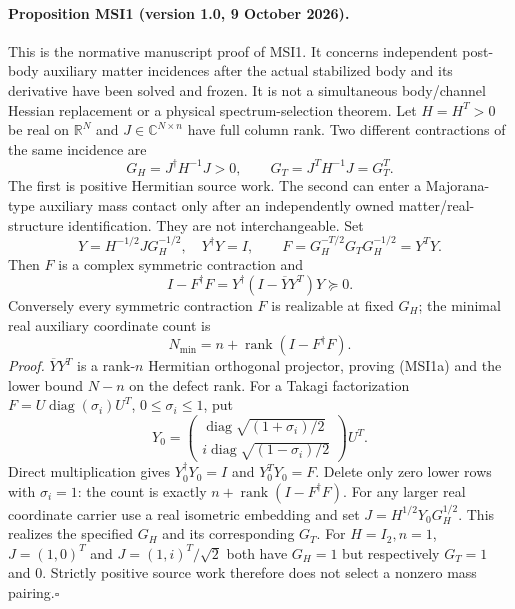 \documentclass[11pt]{article}
\begin{document}
\paragraph{Proposition MSI1 (version 1.0, 9 October 2026).}
\label{prop:msi1}
This is the normative manuscript proof of MSI1. It concerns independent
post-body auxiliary matter incidences after the actual stabilized body and
its derivative have been solved and frozen. It is not a simultaneous
body/channel Hessian replacement or a physical spectrum-selection theorem.
Let $H=H^T>0$ be real on $\mathbb R^N$ and $J\in\mathbb C^{N\times n}$
have full column rank. Two different contractions of the same incidence are
\[
 G_H=J^\dagger H^{-1}J>0,\qquad G_T=J^TH^{-1}J=G_T^T.
\]
The first is positive Hermitian source work. The second can enter a
Majorana-type auxiliary mass contact only after an independently owned
matter/real-structure identification. They are not interchangeable.
Set
\[
 Y=H^{-1/2}JG_H^{-1/2},\quad Y^\dagger Y=I,\qquad
 F=G_H^{-T/2}G_TG_H^{-1/2}=Y^TY.
\]
Then $F$ is a complex symmetric contraction and
\[
 I-F^\dagger F=Y^\dagger(I-\overline Y Y^T)Y\succeq0.
                                                               \tag{MSI1a}
\]
Conversely every symmetric contraction $F$ is realizable at fixed $G_H$;
the minimal real auxiliary coordinate count is
\[
 N_{\min}=n+\operatorname{rank}(I-F^\dagger F).                \tag{MSI1b}
\]
\emph{Proof.} $\overline Y Y^T$ is a rank-$n$ Hermitian orthogonal
projector, proving (MSI1a) and the lower bound $N-n$ on the defect rank.
For a Takagi factorization $F=U\operatorname{diag}(\sigma_i)U^T$,
$0\leq\sigma_i\leq1$, put
\[
 Y_0=\begin{pmatrix}
 \operatorname{diag}\sqrt{(1+\sigma_i)/2}\\
 i\operatorname{diag}\sqrt{(1-\sigma_i)/2}
 \end{pmatrix}U^T.
\]
Direct multiplication gives $Y_0^\dagger Y_0=I$ and $Y_0^TY_0=F$.
Delete only zero lower rows with $\sigma_i=1$: the count is exactly
$n+\operatorname{rank}(I-F^\dagger F)$. For any larger real coordinate
carrier use a real isometric embedding and set $J=H^{1/2}Y_0G_H^{1/2}$.
This realizes the specified $G_H$ and its corresponding $G_T$.
For $H=I_2,n=1$, $J=(1,0)^T$ and $J=(1,i)^T/\sqrt2$ both have
$G_H=1$ but respectively $G_T=1$ and $0$. Strictly positive source work
therefore does not select a nonzero mass pairing.\hfill$\square$
\end{document}
